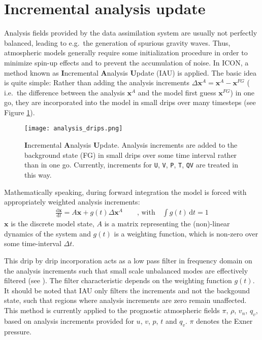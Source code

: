\section{Incremental analysis update}
\label{sec_iau}
Analysis fields provided by the data assimilation system are usually not perfectly balanced, leading to e.g.\ the generation of spurious gravity waves. 
Thus, atmospheric models generally require some initialization procedure in order to minimize spin-up effects and to prevent the accumulation of noise. In ICON, 
a method known as \textbf{I}ncremental \textbf{A}nalysis \textbf{U}pdate (IAU) \citep{Bloom96, Polavarapu04} is applied. The basic idea is quite simple: 
Rather than adding the analysis increments $\Delta \mathbf{x}^{A}=\mathbf{x}^{A} - \mathbf{x}^{FG}$ ( i.e.\ the difference between the analysis 
$\mathbf{x}^{A}$ and the model first guess $\mathbf{x}^{FG}$) in one go, they are incorporated into the model in small drips over many timesteps 
(see Figure \ref{fig_ana_drips}).
\begin{figure}[hbt]
 \centering
 \texttt{[image: analysis\_drips.png]}
 \caption{\textbf{I}ncremental \textbf{A}nalysis \textbf{U}pdate. Analysis increments are added to the background state (FG) in small drips over 
some time interval rather than in one go. Currently, increments for \texttt{U}, \texttt{V}, \texttt{P}, \texttt{T}, \texttt{QV} are treated in 
this way.}\label{fig_ana_drips}
\end{figure}

Mathematically speaking, during forward integration the model is forced with appropriately weighted analysis increments:
\begin{align}
 \frac{\mathrm{d} \mathbf{x}}{\mathrm{d} t} = A\mathbf{x} + g(t)\Delta\mathbf{x}^{A}\qquad \text{, with}\quad \int g(t)\, \mathrm{d}t = 1
\end{align}
$\mathbf{x}$ is the discrete model state, $A$ is a matrix representing the (non)-linear dynamics of the system and $g(t)$ is a weighting 
function, which is non-zero over some time-interval $\Delta t$.

This drip by drip incorporation acts as a low pass filter in frequency domain on the analysis increments such that 
small scale unbalanced modes are effectively filtered (see \cite{Bloom96}). The filter characteristic depends on the weighting function 
$g(t)$. It should be noted that IAU only filters the increments and not the backgound state, such that regions where analysis increments are 
zero remain unaffected. This method is currently applied to the prognostic atmospheric fields $\pi$, $\rho$, $v_{n}$, $q_{v}$, based on 
analysis increments provided for $u$, $v$, $p$, $t$ and $q_{v}$. $\pi$ denotes the Exner pressure.

